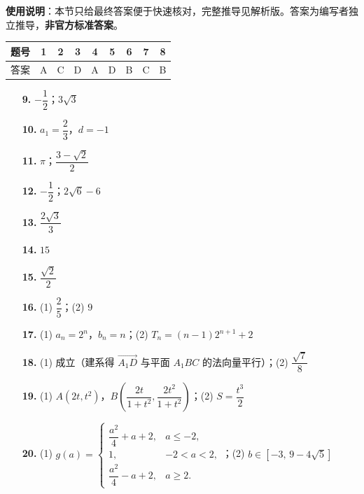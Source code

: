 
\begin{gknotice}
\textbf{使用说明}：本节只给最终答案便于快速核对，完整推导见解析版。答案为编写者独立推导，\textbf{非官方标准答案}。
\end{gknotice}

\begin{center}\begin{tabular}{ccccccccc}
\toprule
题号 & 1 & 2 & 3 & 4 & 5 & 6 & 7 & 8 \\
\midrule
答案 & A & C & D & A & D & B & C & B \\
\bottomrule
\end{tabular}\end{center}

\begin{itemize}[leftmargin=2.6em]
  \item[\textbf{9.}] \(-\dfrac12\)；\(3\sqrt3\)
  \item[\textbf{10.}] \(a_1=\dfrac23\)，\(d=-1\)
  \item[\textbf{11.}] \(\pi\)；\(\dfrac{3-\sqrt2}{2}\)
  \item[\textbf{12.}] \(-\dfrac12\)；\(2\sqrt6-6\)
  \item[\textbf{13.}] \(\dfrac{2\sqrt3}{3}\)
  \item[\textbf{14.}] \(15\)
  \item[\textbf{15.}] \(\dfrac{\sqrt2}{2}\)
\end{itemize}

\begin{itemize}[leftmargin=2.6em]
  \item[\textbf{16.}] (1) \(\dfrac25\)；(2) \(9\)
  \item[\textbf{17.}] (1) \(a_n=2^n\)，\(b_n=n\)；(2) \(T_n=(n-1)2^{n+1}+2\)
  \item[\textbf{18.}] (1) 成立（建系得 \(\overrightarrow{A_1D}\) 与平面 \(A_1BC\) 的法向量平行）；(2) \(\dfrac{\sqrt7}{8}\)
  \item[\textbf{19.}] (1) \(A(2t,t^2)\)，\(B\left(\dfrac{2t}{1+t^2},\dfrac{2t^2}{1+t^2}\right)\)；(2) \(S=\dfrac{t^3}{2}\)
  \item[\textbf{20.}] (1) $g(a)=\begin{cases}\dfrac{a^2}{4}+a+2,&a\leqslant-2,\\1,&-2<a<2,\\\dfrac{a^2}{4}-a+2,&a\geqslant2.\end{cases}$；(2) \(b\in[-3,\,9-4\sqrt5]\)
\end{itemize}
